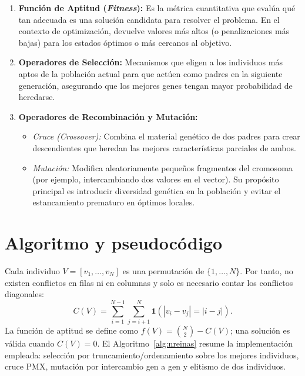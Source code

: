 \documentclass[11pt,a4paper,twocolumn]{article}
\begin{document}
\begin{enumerate}
    \item \textbf{Función de Aptitud (\textit{Fitness}):} Es la métrica cuantitativa que evalúa qué tan adecuada es una solución candidata para resolver el problema. En el contexto de optimización, devuelve valores más altos (o penalizaciones más bajas) para los estados óptimos o más cercanos al objetivo.\cite{russell} 
    
    

    \item \textbf{Operadores de Selección:} Mecanismos que eligen a los individuos más aptos de la población actual para que actúen como padres en la siguiente generación, asegurando que los mejores genes tengan mayor probabilidad de heredarse. \cite{ionos} 
    \item \textbf{Operadores de Recombinación y Mutación:} 
    \begin{itemize}
        \item \textit{Cruce (Crossover):} Combina el material genético de dos padres para crear descendientes que heredan las mejores características parciales de ambos. 
        \item \textit{Mutación:} Modifica aleatoriamente pequeños fragmentos del cromosoma (por ejemplo, intercambiando dos valores en el vector). Su propósito principal es introducir diversidad genética en la población y evitar el estancamiento prematuro en óptimos locales. \cite{ionos}
    \end{itemize}
\end{enumerate}

\section{Algoritmo y pseudocódigo}
Cada individuo $V=[v_1,\ldots,v_N]$ es una permutación de
$\{1,\ldots,N\}$. Por tanto, no existen conflictos en filas ni en
columnas y solo es necesario contar los conflictos diagonales:
\begin{equation*}
    C(V)=\sum_{i=1}^{N-1}\sum_{j=i+1}^{N}
    \mathbf{1}\!\left(|v_i-v_j|=|i-j|\right).
\end{equation*}
La función de aptitud se define como
$f(V)=\binom{N}{2}-C(V)$; una solución es válida cuando $C(V)=0$.
El Algoritmo~\ref{alg:nreinas} resume la implementación empleada: selección por truncamiento/ordenamiento sobre los mejores individuos, cruce PMX, mutación por intercambio gen a gen y elitismo de dos individuos.
\end{document}
